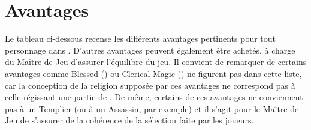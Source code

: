 \section{Avantages}\label{sec:avantages}
Le tableau ci-dessous recense les différents avantages pertinents pour tout
personnage dans \gmc. D'autres avantages peuvent également être achetés, à
charge du Maître de Jeu d'assurer l'équilibre du jeu. Il convient de remarquer
de certains avantages comme Blessed (\cite[p.93]{R}) ou Clerical Magic
(\cite[p.35]{CI}) ne figurent pas dans cette liste, car la conception de la
religion supposée par ces avantages ne correspond pas à celle régissant une
partie de \gmc. De même, certains de ces avantages ne conviennent pas à un
Templier (ou à un Assassin, par exemple) et il s'agit pour le Maître de Jeu de
s'assurer de la cohérence de la sélection faite par les joueurs.

